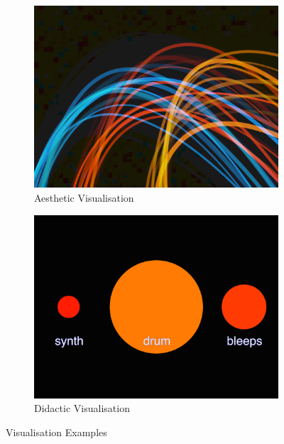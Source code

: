 \documentclass{article}
\begin{document}
\begin{figure}[H]
\centering
\begin{subfigure}{.5\textwidth}
    \centering
    \includegraphics[width=0.9\linewidth]{aesthetic-vis.png}
    \caption{Aesthetic Visualisation}
    \label{avis}
\end{subfigure}%
\begin{subfigure}{.5\textwidth}
    \centering
    \includegraphics[width=0.9\linewidth]{didactic-vis.png}
    \caption{Didactic Visualisation}
    \label{dvis}
\end{subfigure}
\caption{Visualisation Examples}
\end{figure}
\end{document}
